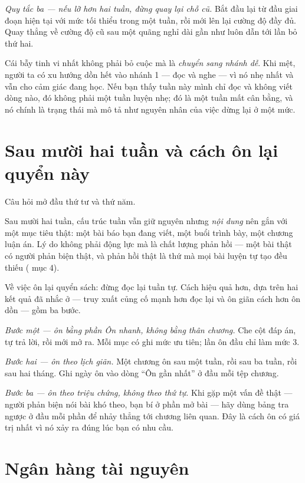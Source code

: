 \documentclass[../../english.tex]{subfiles}
\begin{document}
\emph{Quy tắc ba --- nếu lỡ hơn hai tuần, đừng quay lại chỗ cũ.} Bắt đầu lại từ đầu giai đoạn hiện tại với mức tối thiểu trong một tuần, rồi mới lên lại cường độ đầy đủ. Quay thẳng về cường độ cũ sau một quãng nghỉ dài gần như luôn dẫn tới lần bỏ thứ hai.

\begin{cambay}
Cái bẫy tinh vi nhất không phải bỏ cuộc mà là \emph{chuyển sang nhánh dễ}. Khi mệt, người ta có xu hướng dồn hết vào nhánh 1 --- đọc và nghe --- vì nó nhẹ nhất và vẫn cho cảm giác đang học. Nếu bạn thấy tuần này mình chỉ đọc và không viết dòng nào, đó không phải một tuần luyện nhẹ; đó là một tuần mất cân bằng, và nó chính là trạng thái mà  mô tả như nguyên nhân của việc dừng lại ở một mức.
\end{cambay}

\section{Sau mười hai tuần và cách ôn lại quyển này}

Câu hỏi mở đầu thứ tư và thứ năm.

Sau mười hai tuần, cấu trúc tuần vẫn giữ nguyên nhưng \emph{nội dung} nên gắn với một mục tiêu thật: một bài báo bạn đang viết, một buổi trình bày, một chương luận án. Lý do không phải động lực mà là chất lượng phản hồi --- một bài thật có người phản biện thật, và phản hồi thật là thứ mà mọi bài luyện tự tạo đều thiếu ( mục 4).

Về việc ôn lại quyển sách: đừng đọc lại tuần tự. Cách hiệu quả hơn, dựa trên hai kết quả đã nhắc ở  --- truy xuất củng cố mạnh hơn đọc lại\cite{roediger2006} và ôn giãn cách hơn ôn dồn\cite{cepeda2006} --- gồm ba bước.

\emph{Bước một --- ôn bằng phần \emph{Ôn nhanh}, không bằng thân chương.} Che cột đáp án, tự trả lời, rồi mới mở ra. Mỗi mục có ghi mức ưu tiên; lần ôn đầu chỉ làm mức 3.

\emph{Bước hai --- ôn theo lịch giãn.} Một chương ôn sau một tuần, rồi sau ba tuần, rồi sau hai tháng. Ghi ngày ôn vào dòng ``Ôn gần nhất'' ở đầu mỗi tệp chương.

\emph{Bước ba --- ôn theo triệu chứng, không theo thứ tự.} Khi gặp một vấn đề thật --- người phản biện nói bài khó theo, bạn bí ở phần mở bài --- hãy dùng bảng tra ngược ở đầu mỗi phần để nhảy thẳng tới chương liên quan. Đây là cách ôn có giá trị nhất vì nó xảy ra đúng lúc bạn có nhu cầu.

\section{Ngân hàng tài nguyên}
\end{document}
